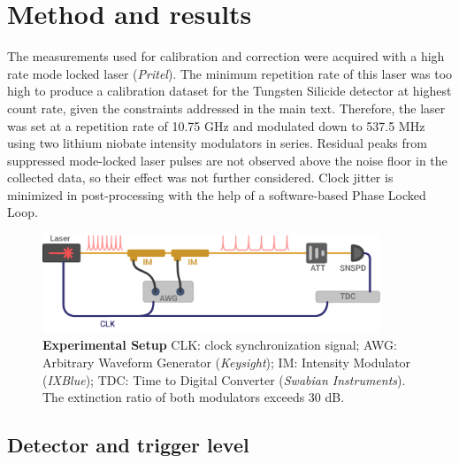 \documentclass[11pt]{caltech_thesis} %
\begin{document}
\hypertarget{method-and-results}{%
\section{Method and results}\label{method-and-results}}

The measurements used for calibration and correction were acquired with a high rate mode locked laser (\emph{Pritel}). The minimum repetition rate of this laser was too high to produce a calibration dataset for the Tungsten Silicide detector at highest count rate, given the constraints addressed in the main text. Therefore, the laser was set at a repetition rate of 10.75 GHz and modulated down to 537.5 MHz using two lithium niobate intensity modulators in series. Residual peaks from suppressed mode-locked laser pulses are not observed above the noise floor in the collected data, so their effect was not further considered. Clock jitter is minimized in post-processing with the help of a software-based Phase Locked Loop.

\hypertarget{fig:jitterate_exp_setup}{%
\begin{figure}
\centering
\includegraphics[width=0.9\textwidth,height=\textheight]{./chapter_03/figs/supplemental_expirement_light.pdf}
\caption[{Time walk experiment setup}]{\textbf{Experimental Setup} CLK: clock synchronization signal; AWG: Arbitrary Waveform Generator (\emph{Keysight}); IM: Intensity Modulator (\emph{IXBlue}); TDC: Time to Digital Converter (\emph{Swabian Instruments}). The extinction ratio of both modulators exceeds 30 dB.}
\label{fig:jitterate_exp_setup}
\end{figure}
}

\hypertarget{detector-and-trigger-level}{%
\subsection{Detector and trigger level}\label{detector-and-trigger-level}}
\end{document}

